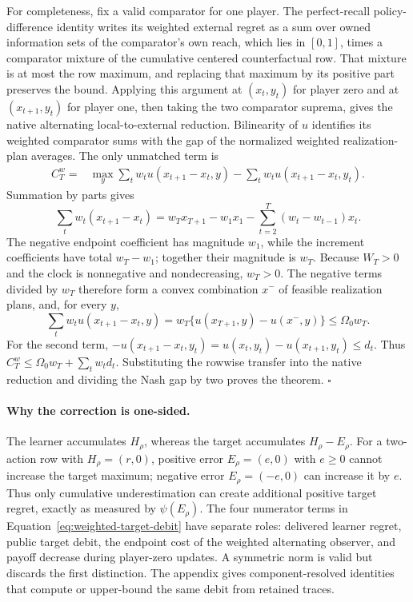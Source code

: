 For completeness, fix a valid comparator for one player.  The perfect-recall
policy-difference identity writes its weighted external regret as a sum over
owned information sets of the comparator's own reach, which lies in $[0,1]$,
times a comparator mixture of the cumulative centered counterfactual row.
That mixture is at most the row maximum, and replacing that maximum by its
positive part preserves the bound.  Applying this argument at
$(x_t,y_t)$ for player zero and at $(x_{t+1},y_t)$ for player one, then taking
the two comparator suprema, gives the native alternating local-to-external
reduction.  Bilinearity of $u$ identifies its weighted comparator sums with
the gap of the normalized weighted realization-plan averages.  The only
unmatched term is
\begin{align}
C_T^w={}&\max_y\sum_t w_tu(x_{t+1}-x_t,y)
-\sum_t w_tu(x_{t+1}-x_t,y_t). \label{eq:weighted-bridge}
\end{align}
Summation by parts gives
\[
\sum_t w_t(x_{t+1}-x_t)=w_Tx_{T+1}-w_1x_1
-\sum_{t=2}^T(w_t-w_{t-1})x_t.
\]
The negative endpoint coefficient has magnitude $w_1$, while the increment
coefficients have total $w_T-w_1$; together their magnitude is $w_T$.
Because $W_T>0$ and the clock is nonnegative and nondecreasing, $w_T>0$.
The negative terms divided by $w_T$ therefore form a convex combination
$x^-$ of feasible realization plans, and, for every $y$,
\[
\sum_t w_tu(x_{t+1}-x_t,y)
=w_T\{u(x_{T+1},y)-u(x^-,y)\}\le \Omega_0w_T.
\]
For the second term,
$-u(x_{t+1}-x_t,y_t)=u(x_t,y_t)-u(x_{t+1},y_t)\le d_t$.
Thus $C_T^w\le\Omega_0w_T+\sum_tw_td_t$.  Substituting the rowwise transfer
into the native reduction and dividing the Nash gap by two proves the
theorem. \hfill$\square$

\paragraph{Why the correction is one-sided.}
The learner accumulates $H_\rho$, whereas the target accumulates
$H_\rho-E_\rho$.  For a two-action row with $H_\rho=(r,0)$, positive error
$E_\rho=(e,0)$ with $e\ge0$ cannot increase the target maximum; negative
error $E_\rho=(-e,0)$ can increase it by $e$.  Thus only cumulative
underestimation can create additional positive target regret, exactly as
measured by $\psi(E_\rho)$.  The four numerator terms in
Equation~\ref{eq:weighted-target-debit} have separate roles: delivered learner
regret, public target debit, the endpoint cost of the weighted alternating
observer, and payoff decrease during player-zero updates.  A symmetric norm
is valid but discards the first distinction.  The appendix gives
component-resolved identities that compute or upper-bound the same debit from
retained traces.

